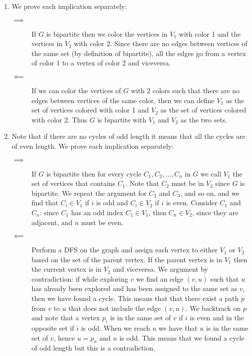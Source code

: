 \documentclass[10pt]{article}
\begin{document}
\begin{enumerate}
    \item We prove each implication separately:
          \begin{description}
              \item[$\implies$] If $G$ is bipartite then we color the vertices in $V_1$ with color 1 and the vertices in $V_2$ with color 2.
                    Since there are no edges between vertices of the same set (by definition of bipartite),
                    all the edges go from a vertex of color 1 to a vertex of color 2 and viceversa.
              \item[$\impliedby$] If we can color the vertices of $G$ with 2 colors such that there are no edges between vertices of the same color,
                    then we can define $V_1$ as the set of vertices colored with color 1 and $V_2$ as the set of vertices colored with color 2.
                    Thus $G$ is bipartite with $V_1$ and $V_2$ as the two sets.
          \end{description}
    \item Note that if there are no cycles of odd length it means that all the cycles are of even length.
          We prove each implication separately:
          \begin{description}
              \item[$\implies$] If $G$ is bipartite then for every cycle $C_1, C_2, \ldots, C_n$ in $G$
                    we call $V_1$ the set of vertices that contains $C_1$. Note that $C_2$ must be in $V_2$ since $G$ is bipartite.
                    We repeat the argument for $C_2$ and $C_3$, and so on, and we find that $C_i \in V_1$ if $i$ is odd and $C_i \in V_2$ if $i$ is even.
                    Consider $C_1$ and $C_n$: since $C_1$ has an odd index $C_1 \in V_1$, then $C_n \in V_2$, since they are adjacent, and $n$ must be even.
              \item[$\impliedby$] Perform a DFS on the graph and assign each vertex to either $V_1$ or $V_2$ based on the set of the parent vertex.
                    If the parent vertex is in $V_1$ then the current vertex is in $V_2$ and viceversa.
                    We argument by contradiction: if while exploring $v$ we find an edge $(v, u)$ such that $u$ has already been explored and
                    has been assigned to the same set as $v$, then we have found a cycle. This means that that there exist a path $p$ from $v$ to $u$ that does not include the edge $(v, u)$.
                    We backtrack on $p$ and note that a vertex $p_i$ is in the same set of $v$ if $i$ is even and in the opposite set if $i$ is odd.
                    When we reach $u$ we have that $u$ is in the same set of $v$, hence $u = p_n$ and $n$ is odd.
                    This means that we found a cycle of odd length but this is a contradiction.
          \end{description}


\end{enumerate}
\end{document}
